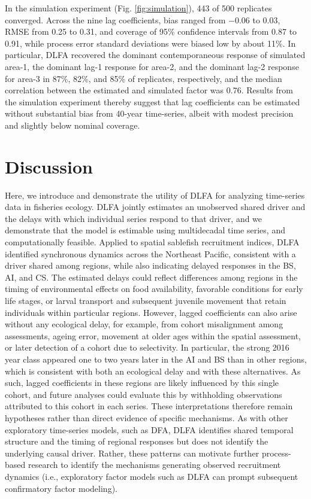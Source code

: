 \documentclass[12pt]{article}
\begin{document}
In the simulation experiment (Fig. \ref{fig:simulation}), 443 of 500
replicates converged. Across the nine
lag coefficients, bias ranged from $-0.06$ to $0.03$, RMSE from 0.25 to
0.31, and coverage of 95\% confidence intervals from 0.87 to 0.91, while
process error standard deviations were biased low by about 11\%. In
particular, DLFA recovered the dominant contemporaneous response of
simulated area-1, the dominant lag-1 response for area-2, and the
dominant lag-2 response for area-3 in 87\%, 82\%, and 85\% of
replicates, respectively, and the median correlation between the
estimated and simulated factor was 0.76. Results from the simulation
experiment thereby suggest that lag coefficients can be estimated
without substantial bias from 40-year time-series, albeit with modest
precision and slightly below nominal coverage.

\section{Discussion}
\label{sec:discussion}

Here, we introduce and demonstrate the utility of DLFA for analyzing
time-series data in fisheries ecology. DLFA jointly estimates an
unobserved shared driver and the delays with which individual series
respond to that driver, and we demonstrate that the model is estimable
using multidecadal time series, and computationally feasible. Applied to
spatial sablefish recruitment indices, DLFA identified synchronous
dynamics across the Northeast Pacific, consistent with a driver shared
among regions, while also indicating delayed responses in the BS, AI,
and CS. The estimated delays could reflect differences among regions in
the timing of environmental effects on food availability, favorable
conditions for early life stages, or larval transport and subsequent
juvenile movement that retain individuals within particular regions.
However, lagged coefficients can also arise without any ecological
delay, for example, from cohort misalignment among assessments, ageing
error, movement at older ages within the spatial assessment, or later
detection of a cohort due to selectivity. In particular, the strong 2016
year class appeared one to two years later in the AI and BS than in
other regions, which is consistent with both an ecological delay and
with these alternatives. As such, lagged coefficients in these regions
are likely influenced by this single cohort, and future analyses could
evaluate this by withholding observations attributed to this cohort in
each series. These interpretations therefore remain hypotheses rather
than direct evidence of specific mechanisms. As with other exploratory time-series models, such
as DFA, DLFA identifies shared temporal structure and the timing of
regional responses but does not identify the underlying causal driver.
Rather, these patterns can motivate further process-based research to
identify the mechanisms generating observed recruitment dynamics (i.e.,
exploratory factor models such as DLFA can prompt subsequent
confirmatory factor modeling).
\end{document}
